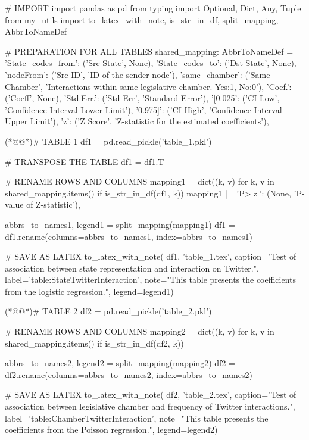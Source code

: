 \documentclass[11pt]{article}
\begin{document}
\begin{python}

# IMPORT
import pandas as pd
from typing import Optional, Dict, Any, Tuple
from my_utils import to_latex_with_note, is_str_in_df, split_mapping, AbbrToNameDef

# PREPARATION FOR ALL TABLES
shared_mapping: AbbrToNameDef = { 
    'State_codes_from': ('Src State', None),
    'State_codes_to': ('Dst State', None),
    'nodeFrom': ('Src ID', 'ID of the sender node'),
    'same_chamber': ('Same Chamber', 'Interactions within same legislative chamber. Yes:1, No:0'),
    'Coef.': ('Coeff', None),
    'Std.Err.': ('Std Err', 'Standard Error'),
    '[0.025': ('CI Low', 'Confidence Interval Lower Limit'),
    '0.975]': ('CI High', 'Confidence Interval Upper Limit'),
    'z': ('Z Score', 'Z-statistic for the estimated coefficients'),
}

(*@@*)# TABLE 1
df1 = pd.read_pickle('table_1.pkl')

# TRANSPOSE THE TABLE
df1 = df1.T

# RENAME ROWS AND COLUMNS 
mapping1 = dict((k, v) for k, v in shared_mapping.items() if is_str_in_df(df1, k)) 
mapping1 |= {
    'P>|z|': (None, 'P-value of Z-statistic'),
}

abbrs_to_names1, legend1 = split_mapping(mapping1)
df1 = df1.rename(columns=abbrs_to_names1, index=abbrs_to_names1)

# SAVE AS LATEX
to_latex_with_note(
    df1, 'table_1.tex',
    caption="Test of association between state representation and interaction on Twitter.", 
    label='table:StateTwitterInteraction',
    note="This table presents the coefficients from the logistic regression.",
    legend=legend1)


(*@@*)# TABLE 2
df2 = pd.read_pickle('table_2.pkl')

# RENAME ROWS AND COLUMNS 
mapping2 = dict((k, v) for k, v in shared_mapping.items() if is_str_in_df(df2, k)) 

abbrs_to_names2, legend2 = split_mapping(mapping2)
df2 = df2.rename(columns=abbrs_to_names2, index=abbrs_to_names2)

# SAVE AS LATEX
to_latex_with_note(
    df2, 'table_2.tex',
    caption="Test of association between legislative chamber and frequency of Twitter interactions.", 
    label='table:ChamberTwitterInteraction',
    note="This table presents the coefficients from the Poisson regression.",
    legend=legend2)

\end{python}
\end{document}
